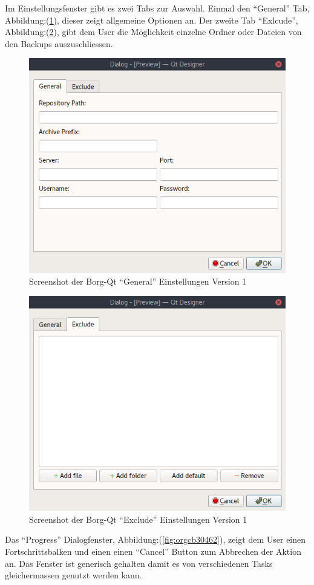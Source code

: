Im Einstellungsfenster gibt es zwei Tabs zur Auswahl. Einmal den "`General"' Tab,
Abbildung:(\ref{fig:org588f6f1}), dieser zeigt allgemeine Optionen
an. Der zweite Tab "`Exlcude"', Abbildung:(\ref{fig:org89e6126}), gibt
dem User die Möglichkeit einzelne Ordner oder Dateien von den Backups
auszuschliessen.

\begin{figure}[H]
\centering
\includegraphics[width=.7\textwidth]{pictures/borgqt_settings_general_v1.png}
\caption{\label{fig:org588f6f1}
Screenshot der Borg-Qt "`General"' Einstellungen Version 1}
\end{figure}

\begin{figure}[H]
\centering
\includegraphics[width=.7\textwidth]{pictures/borgqt_settings_exclude_v1.png}
\caption{\label{fig:org89e6126}
Screenshot der Borg-Qt "`Exclude"' Einstellungen Version 1}
\end{figure}

Das "`Progress"' Dialogfenster, Abbildung:(\ref{fig:orgcb30462}), zeigt dem
User einen Fortschrittsbalken und einen einen "`Cancel"' Button zum Abbrechen der
Aktion an. Das Fenster ist generisch gehalten damit es von verschiedenen Tasks
gleichermassen genutzt werden kann.

